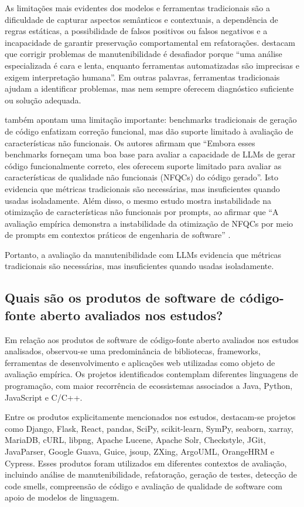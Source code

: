 As limitações mais evidentes dos modelos e ferramentas tradicionais são a dificuldade de capturar aspectos semânticos e contextuais, a dependência de regras estáticas, a possibilidade de falsos positivos ou falsos negativos e a incapacidade de garantir preservação comportamental em refatorações.  destacam que corrigir problemas de manutenibilidade é desafiador porque ``uma análise especializada é cara e lenta, enquanto ferramentas automatizadas são imprecisas e exigem interpretação humana''. Em outras palavras, ferramentas tradicionais ajudam a identificar problemas, mas nem sempre oferecem diagnóstico suficiente ou solução adequada.

 também apontam uma limitação importante: benchmarks tradicionais de geração de código enfatizam correção funcional, mas dão suporte limitado à avaliação de características não funcionais. Os autores afirmam que ``Embora esses benchmarks forneçam uma boa base para avaliar a capacidade de LLMs de gerar código funcionalmente correto, eles oferecem suporte limitado para avaliar as características de qualidade não funcionais (NFQCs) do código gerado''. Isto evidencia que métricas tradicionais são necessárias, mas insuficientes quando usadas isoladamente. Além disso, o mesmo estudo mostra instabilidade na otimização de características não funcionais por prompts, ao afirmar que ``A avaliação empírica demonstra a instabilidade da otimização de NFQCs por meio de prompts em contextos práticos de engenharia de software'' \cite[p.~1, tradução nossa]{SunEtAll}.

Portanto, a avaliação da manutenibilidade com LLMs evidencia que métricas tradicionais são necessárias, mas insuficientes quando usadas isoladamente.

\subsection{Quais são os produtos de software de código-fonte aberto avaliados nos estudos?}

Em relação aos produtos de software de código-fonte aberto avaliados nos estudos analisados, observou-se uma predominância de bibliotecas, frameworks, ferramentas de desenvolvimento e aplicações web utilizadas como objeto de avaliação empírica. Os projetos identificados contemplam diferentes linguagens de programação, com maior recorrência de ecossistemas associados a Java, Python, JavaScript e C/C++.

Entre os produtos explicitamente mencionados nos estudos, destacam-se projetos como Django, Flask, React, pandas, SciPy, scikit-learn, SymPy, seaborn, xarray, MariaDB, cURL, libpng, Apache Lucene, Apache Solr, Checkstyle, JGit, JavaParser, Google Guava, Guice, jsoup, ZXing, ArgoUML, OrangeHRM e Cypress. Esses produtos foram utilizados em diferentes contextos de avaliação, incluindo análise de manutenibilidade, refatoração, geração de testes, detecção de code smells, compreensão de código e avaliação de qualidade de software com apoio de modelos de linguagem.

